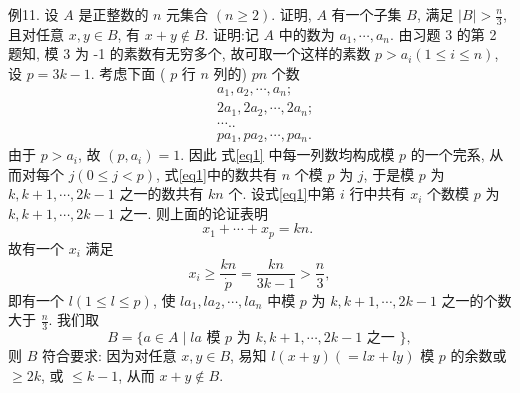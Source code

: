 例11. 设 $A$ 是正整数的 $n$ 元集合 $(n \geqslant 2)$. 证明, $A$ 有一个子集 $B$, 满足 $|B|>\frac{n}{3}$, 且对任意 $x, y \in B$, 有 $x+y \notin B$.
证明:记 $A$ 中的数为 $a_1, \cdots, a_n$. 由习题 3 的第 2 题知, 模 3 为 -1 的素数有无穷多个, 故可取一个这样的素数 $p>a_i(1 \leqslant i \leqslant n)$, 设 $p=3 k-1$. 考虑下面 ( $p$ 行 $n$ 列的) $p n$ 个数
$$
\begin{aligned}
& a_1, a_2, \cdots, a_n ; \\
& 2 a_1, 2 a_2, \cdots, 2 a_n ; \\
& \cdots . . \\
& p a_1, p a_2, \cdots, p a_n .
\end{aligned} \label{eq1}
$$
由于 $p>a_i$, 故 $\left(p, a_i\right)=1$. 因此 式\ref{eq1} 中每一列数均构成模 $p$ 的一个完系, 从而对每个 $j(0 \leqslant j<p)$, 式\ref{eq1}中的数共有 $n$ 个模 $p$ 为 $j$, 于是模 $p$ 为 $k, k+1, \cdots, 2 k-1$ 之一的数共有 $k n$ 个.
设式\ref{eq1}中第 $i$ 行中共有 $x_i$ 个数模 $p$ 为 $k, k+1, \cdots, 2 k-1$ 之一.
则上面的论证表明
$$
x_1+\cdots+x_p=k n \text {. }
$$
故有一个 $x_i$ 满足
$$
x_i \geqslant \frac{k n}{\dot{p}}=\frac{k n}{3 k-1}>\frac{n}{3},
$$
即有一个 $l(1 \leqslant l \leqslant p)$, 使 $l a_1, l a_2, \cdots, l a_n$ 中模 $p$ 为 $k, k+1, \cdots, 2 k-1$ 之一的个数大于 $\frac{n}{3}$. 我们取
$$
B=\{a \in A \mid l a \text { 模 } p \text { 为 } k, k+1, \cdots, 2 k-1 \text { 之一 }\},
$$
则 $B$ 符合要求: 因为对任意 $x, y \in B$, 易知 $l(x+y)(=l x+l y)$ 模 $p$ 的余数或 $\geqslant 2 k$, 或 $\leqslant k-1$, 从而 $x+y \notin B$.



